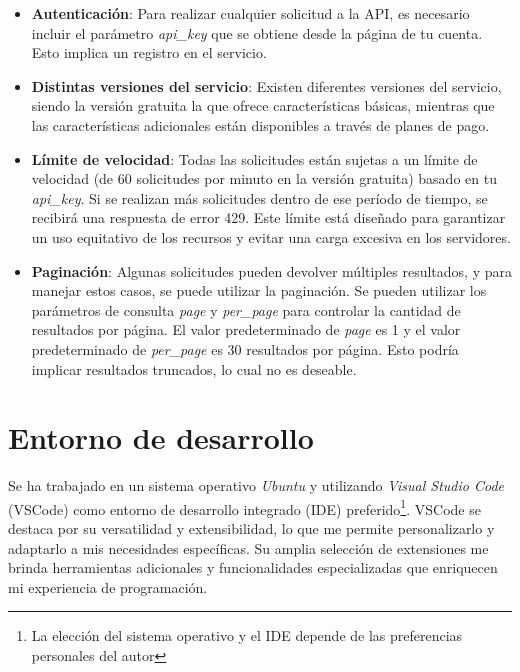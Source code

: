 \begin{itemize}
    \item \textbf{Autenticación}: Para realizar cualquier solicitud a la API, es necesario
          incluir el parámetro \textit{api\_key} que se obtiene desde la página de tu cuenta.
          Esto implica un registro en el servicio.
    \item \textbf{Distintas versiones del servicio}: Existen diferentes versiones del servicio,
          siendo la versión gratuita la que ofrece características básicas, mientras que las características
          adicionales están disponibles a través de planes de pago.
    \item \textbf{Límite de velocidad}: Todas las solicitudes están sujetas a un límite de
          velocidad (de 60 solicitudes por minuto en la versión gratuita) basado en tu \textit{api\_key}.
          Si se realizan más solicitudes dentro de ese período de tiempo, se recibirá una respuesta de error 429. 
          Este límite está diseñado para garantizar un uso equitativo de los recursos y evitar una carga 
          excesiva en los servidores.
    \item \textbf{Paginación}: Algunas solicitudes pueden devolver múltiples resultados, y para
          manejar estos casos, se puede utilizar la paginación. Se pueden utilizar los parámetros de
          consulta \textit{page} y \textit{per\_page} para controlar la cantidad de resultados
          por página. El valor predeterminado de \textit{page} es 1 y el valor predeterminado
          de \textit{per\_page} es 30 resultados por página. Esto podría implicar resultados truncados,
          lo cual no es deseable.
\end{itemize}


\section{Entorno de desarrollo}

Se ha trabajado en un sistema operativo \textit{Ubuntu} y utilizando \textit{Visual Studio Code} 
(VSCode) como entorno de desarrollo integrado (IDE) preferido\footnote{ La elección del sistema 
operativo y el IDE depende de las preferencias personales del autor}. VSCode se destaca por 
su versatilidad y extensibilidad, lo que me permite personalizarlo y adaptarlo a mis necesidades 
específicas. Su amplia selección de extensiones me brinda herramientas adicionales y funcionalidades 
especializadas que enriquecen mi experiencia de programación.

